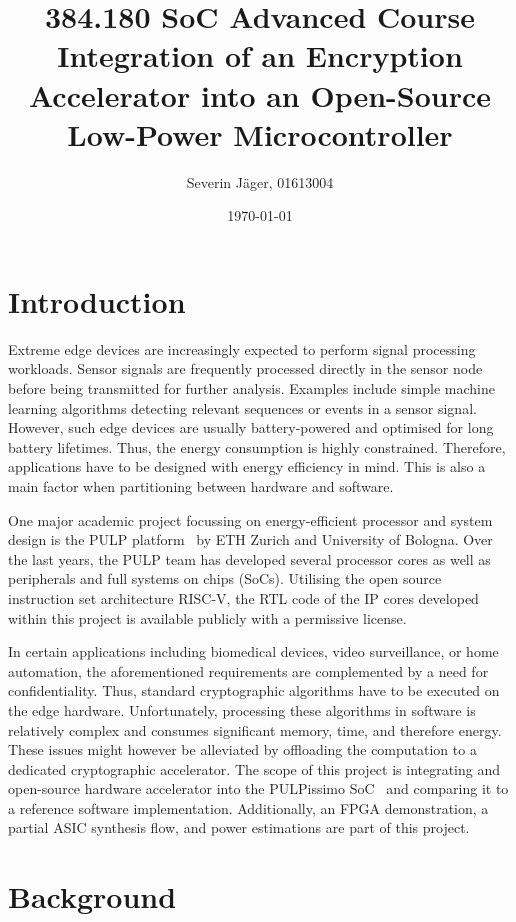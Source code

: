 \documentclass[a4paper, 12pt]{article}
\title{384.180 SoC Advanced Course\\
	   Integration of an Encryption Accelerator
	   into an Open-Source Low-Power Microcontroller}
\author{
  Severin Jäger, 01613004
}
\date{\today}
\begin{document}
\maketitle
\tableofcontents
\pagebreak

\section{Introduction} \label{sec:intro}

Extreme edge devices are increasingly expected to perform signal processing workloads. Sensor signals are frequently processed directly in the sensor node before being transmitted for further analysis. Examples include simple machine learning algorithms detecting relevant sequences or events in a sensor signal. However, such edge devices are usually battery-powered and optimised for long battery lifetimes. Thus, the energy consumption is highly constrained. Therefore, applications have to be designed with energy efficiency in mind. This is also a main factor when partitioning between hardware and software.

One major academic project focussing on energy-efficient processor and system design is the PULP platform~\cite{pulp} by ETH Zurich and University of Bologna. Over the last years, the PULP team has developed several processor cores as well as peripherals and full systems on chips (SoCs). Utilising the open source instruction set architecture RISC-V, the RTL code of the IP cores developed within this project is available publicly with a permissive license.

In certain applications including biomedical devices, video surveillance, or home automation, the aforementioned requirements are complemented by a need for confidentiality. Thus, standard cryptographic algorithms have to be executed on the edge hardware. Unfortunately, processing these algorithms in software is relatively complex and consumes significant memory, time, and therefore energy. These issues might however be alleviated by offloading the computation to a dedicated cryptographic accelerator. The scope of this project is integrating and open-source hardware accelerator into the PULPissimo SoC~\cite{Schiavone2018} and comparing it to a reference software implementation. Additionally, an FPGA demonstration, a partial ASIC synthesis flow, and power estimations are part of this project.

\section{Background} \label{sec:background}
\end{document}
